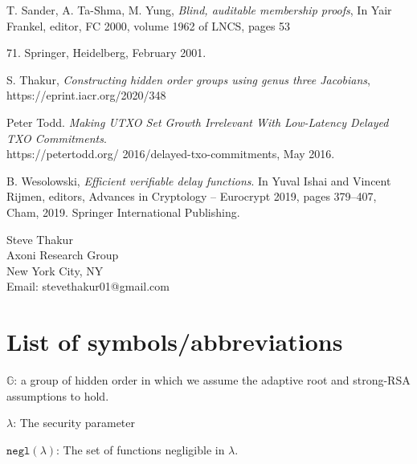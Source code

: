 \documentclass[11pt, lettersize, notitlepage, leqno, footskip=0.6cm]{article}
\newcommand{\ttt}{\texttt}
\newcommand{\negl}{\ttt{{negl}}}
\newcommand{\mb}{\mathbb}
\newcommand{\lam}{\lambda}
\newcommand{\noin}{\noindent}
\numberwithin{equation}{section}
\begin{document}
\noindent [STY01] T. Sander, A. Ta-Shma, M. Yung, \textit{Blind, auditable membership proofs}, In Yair Frankel, editor, FC 2000, volume 1962 of LNCS, pages 53{71. Springer, Heidelberg, February 2001.\vspace{0.1cm}


\noindent [Th20] S. Thakur, \textit{Constructing hidden order groups using genus three Jacobians}, https://eprint.iacr.org/2020/348\vspace{0.1cm} 

\noin [Tod16] Peter Todd. \textit{Making UTXO Set Growth Irrelevant With Low-Latency Delayed TXO Commitments}.\\ https://petertodd.org/
2016/delayed-txo-commitments, May 2016.\vspace{0.1cm}

\noindent [Wes19] B. Wesolowski, \textit{Efficient verifiable delay functions}. In Yuval Ishai and Vincent Rijmen, editors, Advances in Cryptology – Eurocrypt 2019, pages 379–407, Cham, 2019. Springer International Publishing.\vspace{0.1cm}




\bigskip

\normalsize
\noindent Steve Thakur\\
Axoni Research Group\\
New York City, NY\\
Email: stevethakur01@gmail.com


\newpage

\appendix

\section{\fontsize{12}{12}\selectfont List of symbols/abbreviations  }

\noindent $\mb{G}$: a group of hidden order in which we assume the adaptive root and strong-RSA assumptions to hold. \vspace{0.1cm}

\noindent $\lam$: The security parameter \vspace{0.1cm}

\noindent $\negl(\lam)$: The set of functions negligible in $\lam$. \vspace{0.1cm}

}
\end{document}
